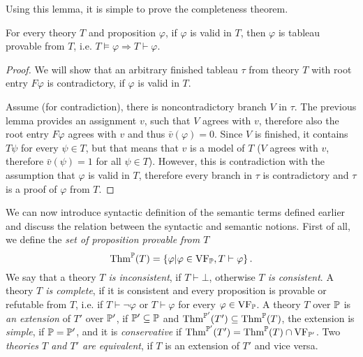 Using this lemma, it is simple to prove the completeness theorem.

\begin{theorem}
For every theory $T$ and proposition $\varphi$, if $\varphi$ is valid in $T$, then $\varphi$ is tableau provable from $T$, i.e. $T \vDash \varphi \Rightarrow T \vdash \varphi$.
\end{theorem}
\begin{proof}
We will show that an arbitrary finished tableau $\tau$ from theory $T$ with root entry $F \varphi$ is contradictory, if $\varphi$ is valid in $T$.

Assume (for contradiction), there is noncontradictory branch $V$ in $\tau$. The previous lemma provides an assignment $v$, such that $V$ agrees with $v$, therefore also the root entry $F \varphi$ agrees with $v$ and thus $\bar{v}(\varphi) = 0$. Since $V$ is finished, it contains $T \psi$ for every $\psi \in T$, but that means that $v$ is a model of $T$ ($V$ agrees with $v$, therefore $\bar{v}(\psi) = 1$ for all $\psi \in T$). However, this is contradiction with the assumption that $\varphi$ is valid in $T$, therefore every branch in $\tau$ is contradictory and $\tau$ is a proof of $\varphi$ from $T$. 
\end{proof}

We can now introduce syntactic definition of the semantic terms defined earlier and discuss the relation between the syntactic and semantic notions. First of all, we define the \emph{set of proposition provable from $T$} $$\operatorname{Thm}^\mathbb{P}(T) = \{\varphi | \varphi \in \operatorname{VF}_\mathbb{P}, T \vdash \varphi\}\,.$$ We say that a theory \emph{$T$ is inconsistent}, if $T \vdash \bot$, otherwise \emph{$T$ is consistent}. A theory \emph{$T$ is complete}, if it is consistent and every proposition is provable or refutable from $T$, i.e. if $T \vdash \neg \varphi$ or $T \vdash \varphi$ for every $\varphi \in \operatorname{VF}_\mathbb{P}$. A theory $T$ over $\mathbb{P}$ is \emph{an extension} of $T'$ over $\mathbb{P}'$, if $\mathbb{P}' \subseteq \mathbb{P}$ and $\operatorname{Thm}^{\mathbb{P}'}(T') \subseteq \operatorname{Thm}^{\mathbb{P}}(T)$, the extension is \emph{simple}, if $\mathbb{P} = \mathbb{P}'$, and it is \emph{conservative} if $\operatorname{Thm}^{\mathbb{P}'}(T') = \operatorname{Thm}^{\mathbb{P}}(T) \cap \operatorname{VF}_{\mathbb{P}'}$. Two \emph{theories $T$ and $T'$ are equivalent}, if $T$ is an extension of $T'$ and vice versa.

